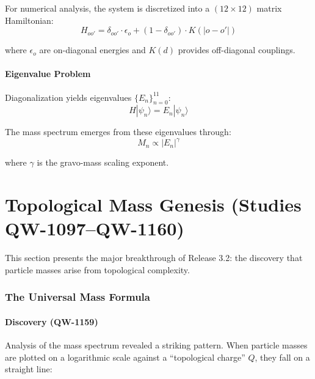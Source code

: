\documentclass[11pt, a4paper]{article}
\theoremstyle{remark}
\newcommand{\QW}[1]{\textbf{QW-#1}}
\begin{document}
For numerical analysis, the system is discretized into a $(12 \times 12)$ matrix Hamiltonian:
\begin{equation}
H_{oo'} = \delta_{oo'} \cdot \epsilon_o + (1 - \delta_{oo'}) \cdot K(|o - o'|)
\end{equation}

where $\epsilon_o$ are on-diagonal energies and $K(d)$ provides off-diagonal couplings.

\subsection{Eigenvalue Problem}

Diagonalization yields eigenvalues $\{E_n\}_{n=0}^{11}$:
\begin{equation}
H |\psi_n\rangle = E_n |\psi_n\rangle
\end{equation}

The mass spectrum emerges from these eigenvalues through:
\begin{equation}
M_n \propto |E_n|^\gamma
\end{equation}

where $\gamma$ is the gravo-mass scaling exponent.

\newpage
\part{Topological Mass Genesis (Studies \QW{1097}--\QW{1160})}

This section presents the major breakthrough of Release 3.2: the discovery that particle masses arise from topological complexity.

\section{The Universal Mass Formula}

\subsection{Discovery (\QW{1159})}

Analysis of the mass spectrum revealed a striking pattern. When particle masses are plotted on a logarithmic scale against a ``topological charge'' $Q$, they fall on a straight line:
\end{document}

